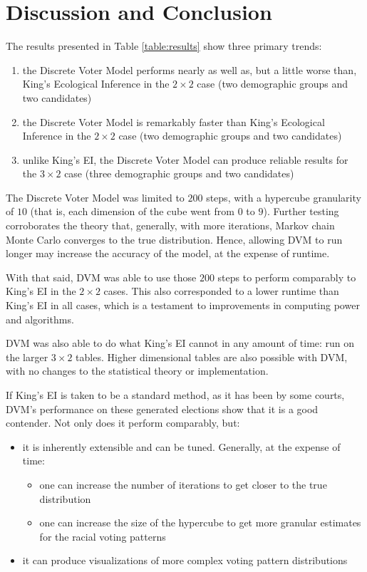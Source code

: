 \documentclass[fleqn,10pt]{style}
\begin{document}
\newpage
\section{Discussion and Conclusion}
\label{sec:conclusion}

The results presented in Table \ref{table:results} show three primary trends:

\begin{enumerate}[noitemsep]
  \item the Discrete Voter Model performs nearly as well as, but a little worse than, King's Ecological Inference in the $2 \times 2$ case (two demographic groups and two candidates)
  \item the Discrete Voter Model is remarkably faster than King's Ecological Inference in the $2 \times 2$ case (two demographic groups and two candidates)
  \item unlike King's EI, the Discrete Voter Model can produce reliable results for the $3 \times 2$ case (three demographic groups and two candidates)
\end{enumerate}

The Discrete Voter Model was limited to $200$ steps, with a hypercube granularity of $10$ (that is, each dimension of the cube went from $0$ to $9$). Further testing corroborates the theory that, generally, with more iterations, Markov chain Monte Carlo converges to the true distribution. Hence, allowing DVM to run longer may increase the accuracy of the model, at the expense of runtime.

With that said, DVM was able to use those $200$ steps to perform comparably to King's EI in the $2 \times 2$ cases. This also corresponded to a lower runtime than King's EI in all cases, which is a testament to improvements in computing power and algorithms.

DVM was also able to do what King's EI cannot in any amount of time: run on the larger $3 \times 2$ tables. Higher dimensional tables are also possible with DVM, with no changes to the statistical theory or implementation.

If King's EI is taken to be a standard method, as it has been by some courts, DVM's performance on these generated elections show that it is a good contender. Not only does it perform comparably, but:

\begin{itemize}
  \item it is inherently extensible and can be tuned. Generally, at the expense of time:
  \begin{itemize}
    \item one can increase the number of iterations to get closer to the true distribution
    \item one can increase the size of the hypercube to get more granular estimates for the racial voting patterns
  \end{itemize}
  \item it can produce visualizations of more complex voting pattern distributions
\end{itemize}
\end{document}
